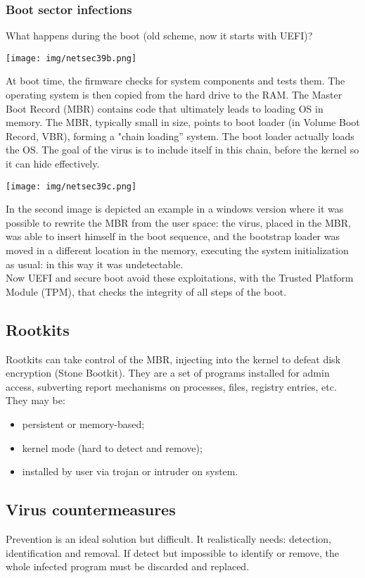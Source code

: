 \documentclass[a4paper, 10pt, titlepage]{article}
\begin{document}
\subsubsection*{Boot sector infections}
What happens during the boot (old scheme, now it starts with UEFI)?
\begin{center}
	\texttt{[image: img/netsec39b.png]}
\end{center}
At boot time, the firmware checks for system components and tests them. The operating system is then copied from the hard drive to the RAM. The Master Boot Record (MBR) contains code that ultimately leads to loading OS in memory. The MBR, typically small in size, points to boot loader (in Volume Boot Record, VBR), forming a "chain loading” system. The boot loader actually loads the OS. The goal of the virus is to include itself in this chain, before the kernel so it can hide effectively.
\begin{center}
	\texttt{[image: img/netsec39c.png]}
\end{center}
In the second image is depicted an example in a windows version where it was possible to rewrite the MBR from the user space: the virus, placed in the MBR, was able to insert himself in the boot sequence, and the bootstrap loader was moved in a different location in the memory, executing the system initialization as usual: in this way it was undetectable. \medskip\\
Now UEFI and secure boot avoid these exploitations, with the Trusted Platform Module (TPM), that checks the integrity of all steps of the boot.

\subsection*{Rootkits}
Rootkits can take control of the MBR,  injecting into the kernel to defeat disk encryption (Stone Bootkit). They are a set of programs installed for admin access, subverting report mechanisms on processes, files, registry entries, etc. They may be:
\begin{itemize}
	\item persistent or memory-based;
	\item kernel mode (hard to detect and remove);
	\item installed by user via trojan or intruder on system.
\end{itemize}

\subsection*{Virus countermeasures}
Prevention is an ideal solution but difficult. It realistically needs: detection, identification and removal. If detect but impossible to identify or remove, the whole infected program must be discarded and replaced.
\end{document}
